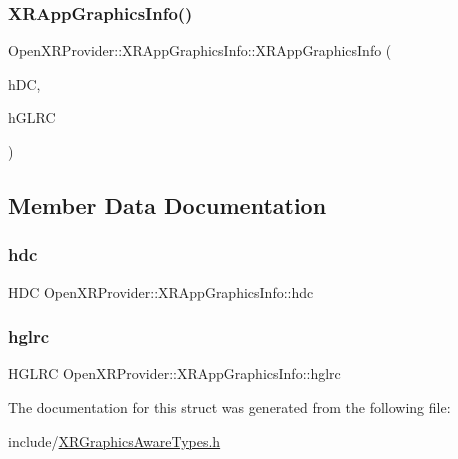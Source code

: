 \subsubsection{\texorpdfstring{XRAppGraphicsInfo()}{XRAppGraphicsInfo()}}
{\footnotesize\ttfamily Open\+X\+R\+Provider\+::\+X\+R\+App\+Graphics\+Info\+::\+X\+R\+App\+Graphics\+Info (\begin{DoxyParamCaption}\item[{H\+DC}]{h\+DC,  }\item[{H\+G\+L\+RC}]{h\+G\+L\+RC }\end{DoxyParamCaption})\hspace{0.3cm}{\ttfamily [inline]}}



\subsection{Member Data Documentation}
\mbox{\label{struct_open_x_r_provider_1_1_x_r_app_graphics_info_a722bda7b4902806d4f1c0de5719e8b34}} 
\subsubsection{\texorpdfstring{hdc}{hdc}}
{\footnotesize\ttfamily H\+DC Open\+X\+R\+Provider\+::\+X\+R\+App\+Graphics\+Info\+::hdc}

\mbox{\label{struct_open_x_r_provider_1_1_x_r_app_graphics_info_a657906fd43aa11d059d2f59f8a940749}} 
\subsubsection{\texorpdfstring{hglrc}{hglrc}}
{\footnotesize\ttfamily H\+G\+L\+RC Open\+X\+R\+Provider\+::\+X\+R\+App\+Graphics\+Info\+::hglrc}



The documentation for this struct was generated from the following file\+:\begin{DoxyCompactItemize}
\item 
include/\mbox{\hyperlink{_x_r_graphics_aware_types_8h}{X\+R\+Graphics\+Aware\+Types.\+h}}\end{DoxyCompactItemize}
